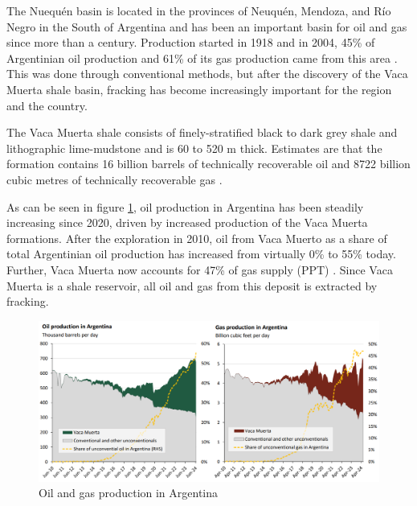The Nuequén basin is located in the provinces of Neuquén, Mendoza, and Río Negro in the South of Argentina and has been an important basin for oil and gas since more than a century. Production started in 1918 and in 2004, 45\% of Argentinian oil production and 61\% of its gas production came from this area \autocite{u.s.energyinformationadministrationTechnicallyRecoverableShale2013}. This was done through conventional methods, but after the discovery of the Vaca Muerta shale basin, fracking has become increasingly important for the region and the country.

The Vaca Muerta shale consists of finely-stratified black to dark grey shale and lithographic lime-mudstone and is 60 to 520 m thick. Estimates are that the formation contains 16 billion barrels of technically recoverable oil and 8722 billion cubic metres of technically recoverable gas \autocite{u.s.energyinformationadministrationTechnicallyRecoverableShale2013}.

As can be seen in figure \ref{fig:oilgasprod}, oil production in Argentina has been steadily increasing since 2020, driven by increased production of the Vaca Muerta formations. After the exploration in 2010, oil from Vaca Muerto as a share of total Argentinian oil production has increased from virtually 0\% to 55\% today. Further, Vaca Muerta now accounts for 47\% of gas supply (PPT) \autocite{internationaltradeadministrationArgentinaCountryCommercial2025}. Since Vaca Muerta is a shale reservoir, all oil and gas from this deposit is extracted by fracking.

\begin{figure}[H]
    \centering
    \includegraphics[width=1\linewidth]{figures/ch9/oilgasproduction.png}
    \caption{Oil and gas production in Argentina \autocite{internationaltradeadministrationArgentinaCountryCommercial2025}}
    \label{fig:oilgasprod}
\end{figure}

